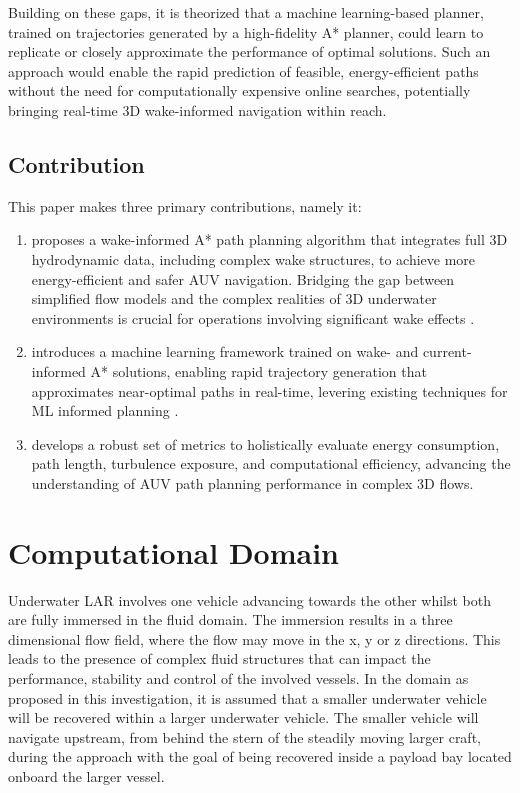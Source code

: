 \documentclass[final,5p,times,twocolumn]{elsarticle}
\begin{document}
Building on these gaps, it is theorized that a machine learning-based planner, trained on trajectories generated by a high-fidelity A* planner, could learn to replicate or closely approximate the performance of optimal solutions. Such an approach would enable the rapid prediction of feasible, energy-efficient paths without the need for computationally expensive online searches, potentially bringing real-time 3D wake-informed navigation within reach.

\subsection{Contribution} %

This paper makes three primary contributions, namely it:

\begin{enumerate}
    \item proposes a wake-informed A* path planning algorithm that integrates full 3D hydrodynamic data, including complex wake structures, to achieve more energy-efficient and safer AUV navigation. Bridging the gap between simplified flow models and the complex realities of 3D underwater environments is crucial for operations involving significant wake effects \cite{IEEE, SUBSTEC}.
    \item introduces a machine learning framework trained on wake- and current-informed A* solutions, enabling rapid trajectory generation that approximates near-optimal paths in real-time, levering existing techniques for ML informed planning \cite{Tai2017, Pfeiffer2017}.
    \item develops a robust set of metrics to holistically evaluate energy consumption, path length, turbulence exposure, and computational efficiency, advancing the understanding of AUV path planning performance in complex 3D flows.
\end{enumerate}

\section{Computational Domain} %
\label{Computational Domain}

Underwater LAR involves one vehicle advancing towards the other whilst both are fully immersed in the fluid domain. The immersion results in a three dimensional flow field, where the flow may move in the x, y or z directions. This leads to the presence of complex fluid structures that can impact the performance, stability and control of the involved vessels. In the domain as proposed in this investigation, it is assumed that a smaller underwater vehicle will be recovered within a larger underwater vehicle. The smaller vehicle will navigate upstream, from behind the stern of the steadily moving larger craft, during the approach with the goal of being recovered inside a payload bay located onboard the larger vessel. 
\end{document}
